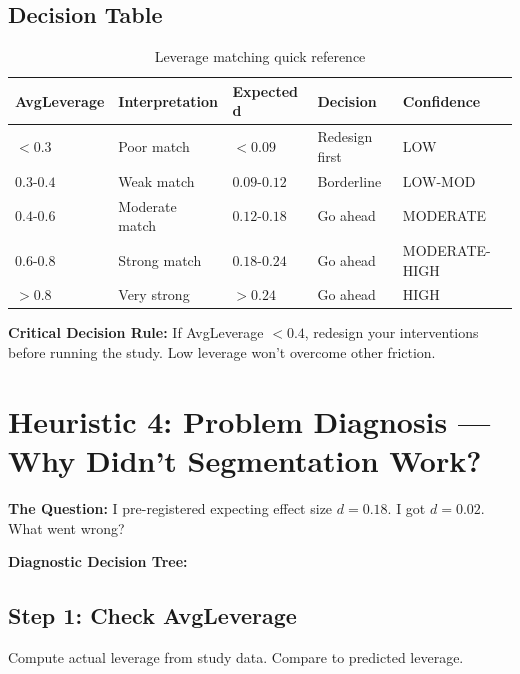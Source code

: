 \subsection{Decision Table}

\begin{table}[h]
\centering
\small
\begin{tabular}{lllll}
\toprule
\textbf{AvgLeverage} & \textbf{Interpretation} & \textbf{Expected d} & \textbf{Decision} & \textbf{Confidence} \\
\midrule
$< 0.3$ & Poor match & $< 0.09$ & Redesign first & LOW \\
$0.3$-$0.4$ & Weak match & $0.09$-$0.12$ & Borderline & LOW-MOD \\
$0.4$-$0.6$ & Moderate match & $0.12$-$0.18$ & Go ahead & MODERATE \\
$0.6$-$0.8$ & Strong match & $0.18$-$0.24$ & Go ahead & MODERATE-HIGH \\
$> 0.8$ & Very strong & $> 0.24$ & Go ahead & HIGH \\
\bottomrule
\end{tabular}
\caption{Leverage matching quick reference}
\label{tab:h3-leverage}
\end{table}

\textbf{Critical Decision Rule:} If AvgLeverage $< 0.4$, redesign your interventions before running the study. Low leverage won't overcome other friction.


\section{Heuristic 4: Problem Diagnosis --- Why Didn't Segmentation Work?}
\label{sec:h4-diagnosis}

\textbf{The Question:} I pre-registered expecting effect size $d = 0.18$. I got $d = 0.02$. What went wrong?

\textbf{Diagnostic Decision Tree:}

\subsection{Step 1: Check AvgLeverage}

Compute actual leverage from study data. Compare to predicted leverage.

